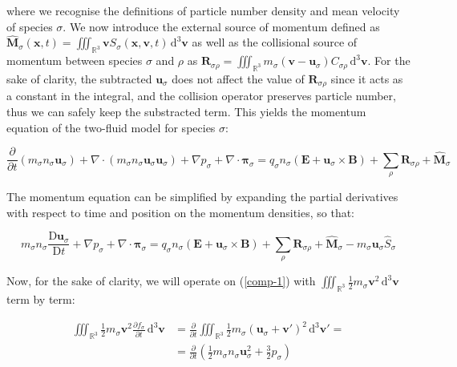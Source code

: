 where we recognise the definitions of particle number density and mean velocity of species $\sigma$. We now introduce the external source of momentum defined as $\mathbf{\hat{M}}_\sigma(\mathbf{x},t)=\iiint_{\mathbb{R}^3}\mathbf{v}S_\sigma(\mathbf{x},\mathbf{v},t)\,\mathrm{d}^3 \mathbf{v}$ as well as the collisional source of momentum between species $\sigma$ and $\rho$ as $\mathbf{R}_{\sigma\rho}=\iiint_{\mathbb{R}^3}m_\sigma \left(\mathbf{v}-\mathbf{u}_\sigma\right)C_{\sigma\rho}\,\mathrm{d}^3 \mathbf{v}$. For the sake of clarity, the subtracted $\mathbf{u}_\sigma$ does not affect the value of $\mathbf{R}_{\sigma\rho}$ since it acts as a constant in the integral, and the collision operator preserves particle number, thus we can safely keep the substracted term. This yields the momentum equation of the two-fluid model for species $\sigma$:

\begin{equation}
    \label{comp-15}
    \frac{\partial}{\partial t} \left(m_\sigma n_\sigma \mathbf{u}_\sigma\right)+\nabla\cdot \left(m_\sigma n_\sigma\mathbf{u}_\sigma\mathbf{u}_\sigma\right)+\nabla p_\sigma+\nabla\cdot\boldsymbol{\pi}_\sigma=q_\sigma n_\sigma \left(\mathbf{E}+\mathbf{u}_\sigma\times \mathbf{B}\right)+\sum_{\rho}\mathbf{R}_{\sigma\rho}+\mathbf{\hat{M}}_\sigma
\end{equation}

The momentum equation can be simplified by expanding the partial derivatives with respect to time and position on the momentum densities, so that:

\begin{equation*}
    m_\sigma n_\sigma \frac{\mathrm{D}\mathbf{u}_\sigma}{\mathrm{D}t}+\nabla  p_\sigma + \nabla\cdot \boldsymbol{\pi}_\sigma = q_\sigma n_\sigma \left(\mathbf{E}+ \mathbf{u}_\sigma \times \mathbf{B}\right)+\sum_{\rho}\mathbf{R}_{\sigma\rho} + \mathbf{\hat{M}}_\sigma - m_\sigma \mathbf{u}_\sigma \hat{S}_\sigma
\end{equation*}

Now, for the sake of clarity, we will operate on (\ref{comp-1}) with $\iiint_{\mathbb{R}^3}\frac{1}{2}m_\sigma \mathbf{v}^2\,\mathrm{d}^3 \mathbf{v}$ term by term:

\begin{align*}
    \iiint_{\mathbb{R}^3}\frac{1}{2}m_\sigma\mathbf{v}^2 \frac{\partial f_\sigma}{\partial t}\,\mathrm{d}^3 \mathbf{v}&=\frac{\partial}{\partial t}\iiint_{\mathbb{R}^3}\frac{1}{2}m_\sigma \left(\mathbf{u}_\sigma+\mathbf{v}'\right)^2\,\mathrm{d}^3 \mathbf{v}'=\\
    &=\frac{\partial}{\partial t}\left(\frac{1}{2}m_\sigma n_\sigma \mathbf{u}_\sigma^2+\frac{3}{2}p_\sigma\right)
\end{align*}

